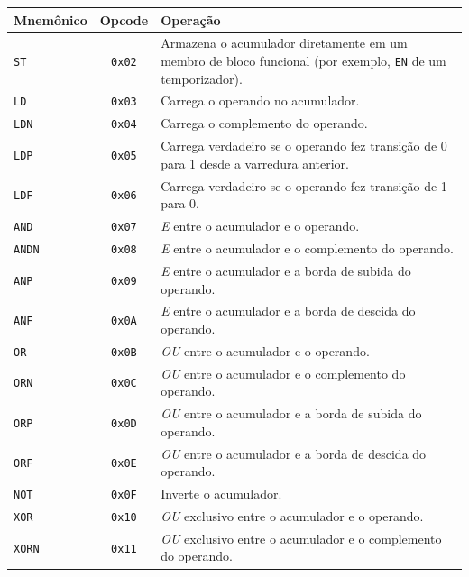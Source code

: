 \begin{quadrofixo}
    \centering
    \begin{tabular}{|l|c|p{9.4cm}|}
        \hline
        Mnemônico & Opcode & Operação \\
        \hline
        \texttt{ST} & \texttt{0x02} & Armazena o acumulador diretamente em um membro de bloco funcional (por exemplo, \texttt{EN} de um temporizador). \\
        \hline
        \texttt{LD} & \texttt{0x03} & Carrega o operando no acumulador. \\
        \hline
        \texttt{LDN} & \texttt{0x04} & Carrega o complemento do operando. \\
        \hline
        \texttt{LDP} & \texttt{0x05} & Carrega verdadeiro se o operando fez transição de 0 para 1 desde a varredura anterior. \\
        \hline
        \texttt{LDF} & \texttt{0x06} & Carrega verdadeiro se o operando fez transição de 1 para 0. \\
        \hline
        \texttt{AND} & \texttt{0x07} & \textit{E} entre o acumulador e o operando. \\
        \hline
        \texttt{ANDN} & \texttt{0x08} & \textit{E} entre o acumulador e o complemento do operando. \\
        \hline
        \texttt{ANP} & \texttt{0x09} & \textit{E} entre o acumulador e a borda de subida do operando. \\
        \hline
        \texttt{ANF} & \texttt{0x0A} & \textit{E} entre o acumulador e a borda de descida do operando. \\
        \hline
        \texttt{OR} & \texttt{0x0B} & \textit{OU} entre o acumulador e o operando. \\
        \hline
        \texttt{ORN} & \texttt{0x0C} & \textit{OU} entre o acumulador e o complemento do operando. \\
        \hline
        \texttt{ORP} & \texttt{0x0D} & \textit{OU} entre o acumulador e a borda de subida do operando. \\
        \hline
        \texttt{ORF} & \texttt{0x0E} & \textit{OU} entre o acumulador e a borda de descida do operando. \\
        \hline
        \texttt{NOT} & \texttt{0x0F} & Inverte o acumulador. \\
        \hline
        \texttt{XOR} & \texttt{0x10} & \textit{OU} exclusivo entre o acumulador e o operando. \\
        \hline
        \texttt{XORN} & \texttt{0x11} & \textit{OU} exclusivo entre o acumulador e o complemento do operando. \\

\end{tabular}
\end{quadrofixo}
